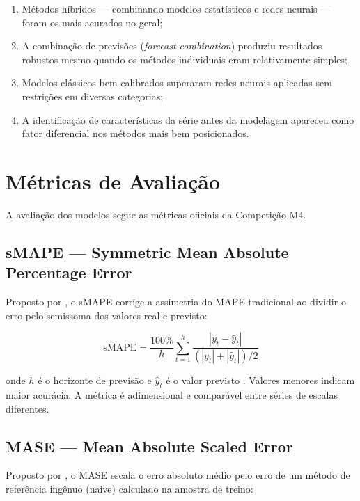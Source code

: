 \documentclass[
  12pt,
  openright,
  twoside,
  a4paper,
  english,
  brazil
]{abntex2}
\begin{document}
\begin{enumerate}
  \item Métodos híbridos — combinando modelos estatísticos e redes neurais — foram os mais acurados no geral;
  \item A combinação de previsões (\textit{forecast combination}) produziu resultados robustos mesmo quando os métodos individuais eram relativamente simples;
  \item Modelos clássicos bem calibrados superaram redes neurais aplicadas sem restrições em diversas categorias;
  \item A identificação de características da série antes da modelagem apareceu como fator diferencial nos métodos mais bem posicionados.
\end{enumerate}

\section{Métricas de Avaliação}
\label{sec:metricas}

A avaliação dos modelos segue as métricas oficiais da Competição M4.

\subsection{sMAPE — Symmetric Mean Absolute Percentage Error}
\label{subsec:smape}

Proposto por , o sMAPE corrige a assimetria do MAPE tradicional ao dividir o erro pelo semissoma dos valores real e previsto:

\begin{equation}
  \text{sMAPE} = \frac{100\%}{h} \sum_{t=1}^{h} \frac{|y_t - \hat{y}_t|}{(|y_t| + |\hat{y}_t|)/2}
  \label{eq:smape}
\end{equation}

onde $h$ é o horizonte de previsão e $\hat{y}_t$ é o valor previsto \cite{makridakis1993accuracy}. Valores menores indicam maior acurácia. A métrica é adimensional e comparável entre séries de escalas diferentes.

\subsection{MASE — Mean Absolute Scaled Error}
\label{subsec:mase}

Proposto por , o MASE escala o erro absoluto médio pelo erro de um método de referência ingênuo (naive) calculado na amostra de treino:
\end{document}

